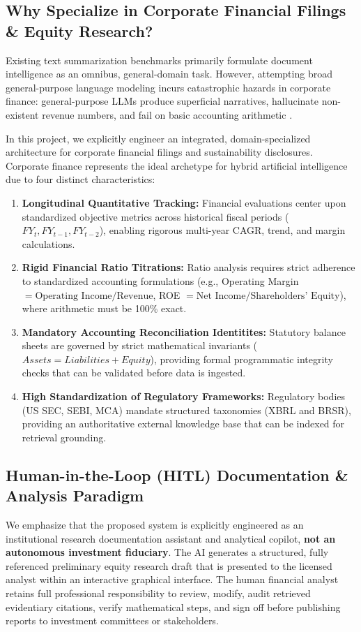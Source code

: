 \documentclass[conference]{IEEEtran}
\begin{document}
\subsection{Why Specialize in Corporate Financial Filings \& Equity Research?}
Existing text summarization benchmarks primarily formulate document intelligence as an omnibus, general-domain task. However, attempting broad general-purpose language modeling incurs catastrophic hazards in corporate finance: general-purpose LLMs produce superficial narratives, hallucinate non-existent revenue numbers, and fail on basic accounting arithmetic \cite{chen2021finqa, islam2023financebench}.

In this project, we explicitly engineer an integrated, domain-specialized architecture for corporate financial filings and sustainability disclosures. Corporate finance represents the ideal archetype for hybrid artificial intelligence due to four distinct characteristics:
\begin{enumerate}
    \item \textbf{Longitudinal Quantitative Tracking:} Financial evaluations center upon standardized objective metrics across historical fiscal periods ($FY_{t}, FY_{t-1}, FY_{t-2}$), enabling rigorous multi-year CAGR, trend, and margin calculations.
    \item \textbf{Rigid Financial Ratio Titrations:} Ratio analysis requires strict adherence to standardized accounting formulations (e.g., Operating Margin $= \text{Operating Income} / \text{Revenue}$, ROE $= \text{Net Income} / \text{Shareholders' Equity}$), where arithmetic must be 100\% exact.
    \item \textbf{Mandatory Accounting Reconciliation Identitites:} Statutory balance sheets are governed by strict mathematical invariants ($Assets = Liabilities + Equity$), providing formal programmatic integrity checks that can be validated before data is ingested.
    \item \textbf{High Standardization of Regulatory Frameworks:} Regulatory bodies (US SEC, SEBI, MCA) mandate structured taxonomies (XBRL and BRSR), providing an authoritative external knowledge base that can be indexed for retrieval grounding.
\end{enumerate}

\subsection{Human-in-the-Loop (HITL) Documentation \& Analysis Paradigm}
We emphasize that the proposed system is explicitly engineered as an institutional research documentation assistant and analytical copilot, \textbf{not an autonomous investment fiduciary}. The AI generates a structured, fully referenced preliminary equity research draft that is presented to the licensed analyst within an interactive graphical interface. The human financial analyst retains full professional responsibility to review, modify, audit retrieved evidentiary citations, verify mathematical steps, and sign off before publishing reports to investment committees or stakeholders.
\end{document}
